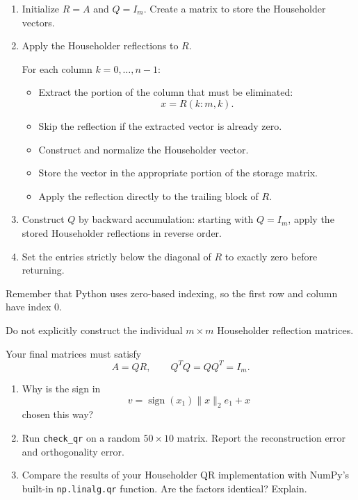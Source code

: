 \documentclass{ximera}
\begin{document}
\begin{enumerate}
    \item Initialize $R=A$ and $Q=I_m$. Create a matrix to
    store the Householder vectors.

    \item Apply the Householder reflections to $R$.

    For each column $k=0,\ldots,n-1$:

    \begin{itemize}
        \item Extract the portion of the column that must be
        eliminated:
        \[
        x=R(k:m,k).
        \]

        \item Skip the reflection if the extracted vector is
        already zero.

        \item Construct and normalize the Householder vector.

        \item Store the vector in the appropriate portion of
        the storage matrix.

        \item Apply the reflection directly to the trailing
        block of $R$.
    \end{itemize}

    \item Construct $Q$ by backward accumulation: starting with
    $Q=I_m$, apply the stored Householder reflections in reverse
    order.

    \item Set the entries strictly below the diagonal of $R$
    to exactly zero before returning.
\end{enumerate}

Remember that Python uses zero-based indexing, so the first
row and column have index 0.

Do not explicitly construct the individual $m\times m$
Householder reflection matrices.

Your final matrices must satisfy
\[
A=QR,\qquad Q^TQ=QQ^T=I_m.
\]

\begin{exercise}

\begin{enumerate}

    \item Why is the sign in
    \[
    v=\operatorname{sign}(x_1)\|x\|_2e_1+x
    \]
    chosen this way?

    \item Run \texttt{check\_qr} on a random $50\times10$ matrix.
    Report the reconstruction error and orthogonality error.

    \item Compare the results of your Householder QR
    implementation with NumPy's built-in \texttt{np.linalg.qr}
    function. Are the factors identical? Explain.

\end{enumerate}

\end{exercise}
\end{document}
